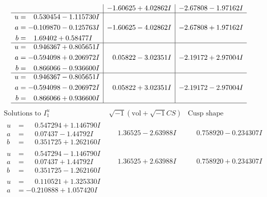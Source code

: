 \documentclass[1p]{elsarticle_modified}
\theoremstyle{definition}
\newcommand{\I}{\sqrt{-1}}
\begin{document}
$$\begin{array}{c|c|c}
 & -1.60625 + 4.02862 I & -2.67808 - 1.97162 I \\ \hline\begin{aligned}
u &= \phantom{-}0.530454 - 1.115730 I \\
a &= -0.109870 - 0.125763 I \\
b &= \phantom{-}1.69402 + 0.58477 I\end{aligned}
 & -1.60625 - 4.02862 I & -2.67808 + 1.97162 I \\ \hline\begin{aligned}
u &= \phantom{-}0.946367 + 0.805651 I \\
a &= -0.594098 + 0.206972 I \\
b &= \phantom{-}0.866066 - 0.936600 I\end{aligned}
 & \phantom{-}0.05822 - 3.02351 I & -2.19172 + 2.97004 I \\ \hline\begin{aligned}
u &= \phantom{-}0.946367 - 0.805651 I \\
a &= -0.594098 - 0.206972 I \\
b &= \phantom{-}0.866066 + 0.936600 I\end{aligned}
 & \phantom{-}0.05822 + 3.02351 I & -2.19172 - 2.97004 I\\
 \hline 
 \end{array}$$\newpage$$\begin{array}{c|c|c}  
\text{Solutions to }I^u_{1}& \I (\text{vol} + \sqrt{-1}CS) & \text{Cusp shape}\\
 \hline 
\begin{aligned}
u &= \phantom{-}0.547294 + 1.146790 I \\
a &= \phantom{-}0.07437 - 1.44792 I \\
b &= \phantom{-}0.351725 + 1.262160 I\end{aligned}
 & \phantom{-}1.36525 - 2.63988 I & \phantom{-}0.758920 - 0.234307 I \\ \hline\begin{aligned}
u &= \phantom{-}0.547294 - 1.146790 I \\
a &= \phantom{-}0.07437 + 1.44792 I \\
b &= \phantom{-}0.351725 - 1.262160 I\end{aligned}
 & \phantom{-}1.36525 + 2.63988 I & \phantom{-}0.758920 + 0.234307 I \\ \hline\begin{aligned}
u &= \phantom{-}0.110521 + 1.325330 I \\
a &= -0.210888 + 1.057420 I \\

\end{aligned}
\end{array}$$
\end{document}
